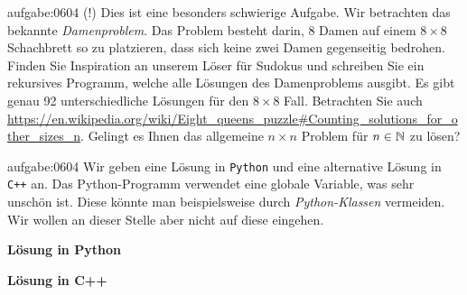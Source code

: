 \lstset{basicstyle=\ttfamily\tiny}
\begin{aufgabe}{aufgabe:0604}
(!) Dies ist eine besonders schwierige Aufgabe. Wir betrachten das bekannte \textit{Damenproblem}. Das Problem besteht darin, 8 Damen auf einem $8\times 8$ Schachbrett so zu platzieren, dass sich keine zwei Damen gegenseitig bedrohen. Finden Sie Inspiration an unserem Löser für Sudokus und schreiben Sie ein rekursives Programm, welche alle Lösungen des Damenproblems ausgibt. Es gibt genau 92 unterschiedliche Lösungen für den $8\times 8$ Fall. Betrachten Sie auch \url{https://en.wikipedia.org/wiki/Eight\_queens\_puzzle#Counting\_solutions\_for\_other\_sizes\_n}. Gelingt es Ihnen das allgemeine $n\times n$ Problem für $n\in\mathbb{N}$ zu lösen?
\end{aufgabe}

\begin{antwort}{aufgabe:0604}
Wir geben eine Lösung in \verb|Python| und eine alternative Lösung in \verb|C++| an. Das Python-Programm verwendet eine globale Variable, was sehr unschön ist. Diese könnte man beispielsweise durch \textit{Python-Klassen} vermeiden. Wir wollen an dieser Stelle aber nicht auf diese eingehen.
\vspace{1cm}

\noindent
\textbf{Lösung in Python}


\noindent
\textbf{Lösung in C++}



\end{antwort}

\lstset{style=mystyle}
\clearpage
\shipoutAnswer